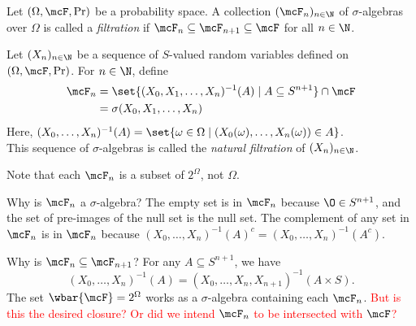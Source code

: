 \begin{definition}[Filtration] \label{def:filtration}
    Let $(\Omega, \F, \Pr)$ be a probability space.
    A collection $(\F_n)_{n \in \N}$ of $\sigma$-algebras over $\Omega$ is
    called a \emph{filtration} if $\F_n \subseteq \F_{n+1} \subseteq \F$
    for all $n \in \N$.
\end{definition}
\begin{definition} \label{def:natural_filtration}
    Let $(X_n)_{n \in \N}$ be a sequence of $S$-valued random variables
    defined on $(\Omega, \F, \Pr)$.
    For $n \in \N$, define \begin{align*}
        \F_n &= \set{(X_0, X_1, \dots, X_n)^{-1}(A) \mid A \subseteq
                S^{n+1}} \cap \F \\ %
            &= \sigma(X_0, X_1, \dots, X_n)
    \end{align*}
    Here, $(X_0, \dots, X_n)^{-1}(A) = \set{\omega \in \Omega \mid
    (X_0(\omega), \dots, X_n(\omega)) \in A}$. \\
    This sequence of $\sigma$-algebras is called the \emph{natural
    filtration} of $(X_n)_{n \in \N}$.
\end{definition}
\begin{remark}
    Note that each $\F_n$ is a subset of $2^\Omega$, not $\Omega$.

    Why is $\F_n$ a $\sigma$-algebra?
    The empty set is in $\F_n$ because $\O \in S^{n+1}$, and the set of
    pre-images of the null set is the null set.
    The complement of any set in $\F_n$ is in $\F_n$ because
    $(X_0, \dots, X_n)^{-1}(A)^c = (X_0, \dots, X_n)^{-1}(A^c)$.

    Why is $\F_n \subseteq \F_{n+1}$?
    For any $A \subseteq S^{n+1}$, we have \[
        (X_0, \dots, X_n)^{-1}(A)
            = (X_0, \dots, X_n, X_{n+1})^{-1}(A \times S).
    \]
    The set $\wbar{\F} = 2^\Omega$ works as a $\sigma$-algebra containing each
    $\F_n$.
    \textcolor{Red}{But is this the desired closure?
    Or did we intend $\F_n$ to be intersected with $\F$?}
\end{remark}

